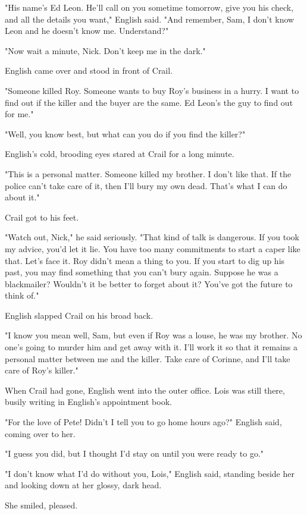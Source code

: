 \documentclass{novel}
\begin{document}
"His name's Ed Leon. He'll call on you sometime tomorrow, give you his check, and all the details you want," English said. "And remember, Sam, I don't know Leon and he doesn't know me. Understand?"

"Now wait a minute, Nick. Don't keep me in the dark."

English came over and stood in front of Crail.

"Someone killed Roy. Someone wants to buy Roy's business in a hurry. I want to find out if the killer and the buyer are the same. Ed Leon's the guy to find out for me."

"Well, you know best, but what can you do if you find the killer?"

English's cold, brooding eyes stared at Crail for a long minute.

"This is a personal matter. Someone killed my brother. I don't like that. If the police can't take care of it, then I'll bury my own dead. That's what I can do about it."

Crail got to his feet.

"Watch out, Nick," he said seriously. "That kind of talk is dangerous. If you took my advice, you'd let it lie. You have too many commitments to start a caper like that. Let's face it. Roy didn't mean a thing to you. If you start to dig up his past, you may find something that you can't bury again. Suppose he was a blackmailer? Wouldn't it be better to forget about it? You've got the future to think of."

English slapped Crail on his broad back.

"I know you mean well, Sam, but even if Roy was a louse, he was my brother. No one's going to murder him and get away with it. I'll work it so that it remains a personal matter between me and the killer. Take care of Corinne, and I'll take care of Roy's killer."

When Crail had gone, English went into the outer office. Lois was still there, busily writing in English's appointment book.

"For the love of Pete! Didn't I tell you to go home hours ago?" English said, coming over to her.

"I guess you did, but I thought I'd stay on until you were ready to go."

"I don't know what I'd do without you, Lois," English said, standing beside her and looking down at her glossy, dark head.

She smiled, pleased.
\end{document}
